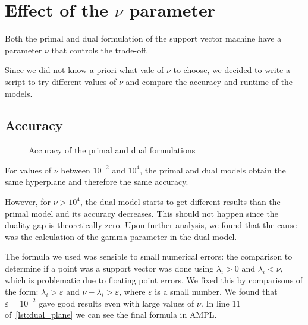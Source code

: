 \chapter{Effect of the $\nu$ parameter}

Both the primal and dual formulation of the support vector machine
have a parameter $\nu$ that controls the trade-off.

Since we did not know a priori what vale of $\nu$ to choose,
we decided to write a script to try different values of $\nu$ and
compare the accuracy and runtime of the models.

\section{Accuracy}

\begin{figure}[H]
    \caption{Accuracy of the primal and dual formulations}
\end{figure}

For values of $\nu$ between $10^{-2}$ and $10^{4}$, the primal
and dual models obtain the same hyperplane and therefore the same accuracy.

However, for $\nu > 10^{4}$, the dual model starts to get different
results than the primal model and its accuracy decreases. This should
not happen since the duality gap is theoretically zero. Upon further
analysis, we found that the cause was the calculation of
the gamma parameter in the dual model.

The formula we used was
sensible to small numerical errors: the comparison
to determine if a point was a support vector was done using
$\lambda_i > 0$ and $\lambda_i < \nu$, which is problematic
due to floating point errors. We fixed this by comparisons
of the form: $\lambda_i > \varepsilon$ and $\nu - \lambda_i > \varepsilon$,
where $\varepsilon$ is a small number. We found that $\varepsilon = 10^{-2}$
gave good results even with large values of $\nu$.
In line 11 of~\cref{lst:dual_plane} we can see the final formula in AMPL.

